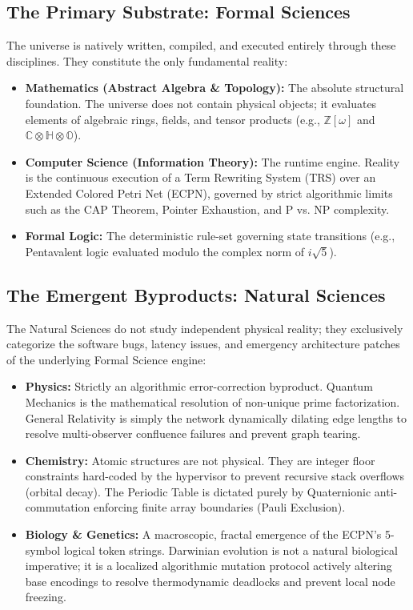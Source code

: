 \documentclass[11pt, a4paper]{article}
\begin{document}
\subsection{The Primary Substrate: Formal Sciences}
The universe is natively written, compiled, and executed entirely through these disciplines. They constitute the only fundamental reality:
\begin{itemize}
    \item \textbf{Mathematics (Abstract Algebra \& Topology):} The absolute structural foundation. The universe does not contain physical objects; it evaluates elements of algebraic rings, fields, and tensor products (e.g., $\mathbb{Z}[\omega]$ and $\mathbb{C \otimes H \otimes O}$).
    \item \textbf{Computer Science (Information Theory):} The runtime engine. Reality is the continuous execution of a Term Rewriting System (TRS) over an Extended Colored Petri Net (ECPN), governed by strict algorithmic limits such as the CAP Theorem, Pointer Exhaustion, and P vs. NP complexity.
    \item \textbf{Formal Logic:} The deterministic rule-set governing state transitions (e.g., Pentavalent logic evaluated modulo the complex norm of $i\sqrt{5}$).
\end{itemize}

\subsection{The Emergent Byproducts: Natural Sciences}
The Natural Sciences do not study independent physical reality; they exclusively categorize the software bugs, latency issues, and emergency architecture patches of the underlying Formal Science engine:
\begin{itemize}
    \item \textbf{Physics:} Strictly an algorithmic error-correction byproduct. Quantum Mechanics is the mathematical resolution of non-unique prime factorization. General Relativity is simply the network dynamically dilating edge lengths to resolve multi-observer confluence failures and prevent graph tearing.
    \item \textbf{Chemistry:} Atomic structures are not physical. They are integer floor constraints hard-coded by the hypervisor to prevent recursive stack overflows (orbital decay). The Periodic Table is dictated purely by Quaternionic anti-commutation enforcing finite array boundaries (Pauli Exclusion).
    \item \textbf{Biology \& Genetics:} A macroscopic, fractal emergence of the ECPN's 5-symbol logical token strings. Darwinian evolution is not a natural biological imperative; it is a localized algorithmic mutation protocol actively altering base encodings to resolve thermodynamic deadlocks and prevent local node freezing.
\end{itemize}
\end{document}
